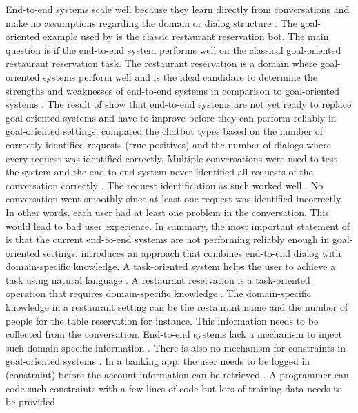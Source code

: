 End-to-end systems scale well because they learn directly from conversations and make no assumptions regarding the domain or dialog structure \cite{bordes2016learning}. 
The goal-oriented example used by \citet{bordes2016learning} is the classic restaurant reservation bot.
The main question is if the end-to-end system performs well on the classical goal-oriented restaurant reservation task.
The restaurant reservation is a domain where goal-oriented systems perform well and is the ideal candidate
to determine the strengths and weaknesses of end-to-end systems in comparison to goal-oriented systems \cite{bordes2016learning}.
The result of \citet{bordes2016learning} show that end-to-end systems are not yet ready to replace goal-oriented 
systems and have to improve before they can perform reliably in goal-oriented settings. 
\citet{bordes2016learning} compared the chatbot types based on the number of correctly identified requests (true positives)
and the number of dialogs where every request was identified correctly.
Multiple conversations were used to test the system and the end-to-end system never identified 
all requests of the conversation correctly \cite{bordes2016learning}.
The request identification as such worked well \cite{bordes2016learning}.
No conversation went smoothly since at least one request was identified incorrectly.
In other words, each user had at least one problem in the conversation.
This would lead to bad user experience. 
In summary, the most important statement of \citet{bordes2016learning} is that the current end-to-end systems are
not performing reliably enough in goal-oriented settings.
\citet{williams2017hybrid} introduces an approach that combines end-to-end dialog with domain-specific knowledge.
A task-oriented system helps the user to achieve a task using natural language \cite{williams2017hybrid}.
A restaurant reservation is a task-oriented operation that requires domain-specific knowledge \cite{williams2017hybrid}.
The domain-specific knowledge in a restaurant setting can be the restaurant name and the number of people for the table reservation for instance. 
This information needs to be collected from the conversation.
End-to-end systems lack a mechanism to inject such domain-specific information \cite{williams2017hybrid}.
There is also no mechanism for constraints in goal-oriented systems \cite{williams2017hybrid}.
In a banking app, the user needs to be logged in (constraint) before the account information can be retrieved \cite{williams2017hybrid}.
A programmer can code such constraints with a few lines of code but lots of training data needs to be provided 

